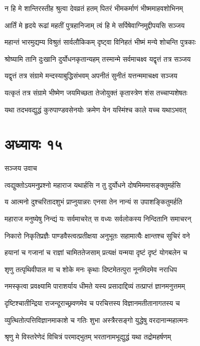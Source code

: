 \twolineshloka
{न हि मे शान्तिरस्तीह श्रुत्वा देवव्रतं हतम्}
{पितरं भीमकर्माणं भीष्ममाहवशोभिनम्}


\twolineshloka
{आर्तिं मे हृदये रूढां महतीं पुत्रहानिजाम्}
{त्वं हि मे सर्पिषेवाग्निमुद्दीपयसि सञ्जय}


\twolineshloka
{महान्तं भारमुद्यम्य विश्रुतं सार्वलौकिकम्}
{दृष्ट्वा विनिहतं भीष्मं मन्ये शोचन्ति पुत्रकाः}


\twolineshloka
{श्रोष्यामि तानि दुःखानि दुर्योधनकृतान्यहम्}
{तस्मान्मे सर्वमाचक्ष्व यद्वृत्तं तत्र सञ्जय}


\twolineshloka
{यद्वृत्तं तत्र संग्रामे मन्दस्याबुद्धिसंभवम्}
{अपनीतं सुनीतं यत्तन्ममाचक्ष्व सञ्जय}


\twolineshloka
{यत्कृतं तत्र संग्रामे भीष्मेण जयमिच्छता}
{तेजोयुक्तं कृतास्त्रेण शंस तच्चाप्यशेषतः}


\twolineshloka
{यथा तदभवद्युद्धं कुरुपाण्डवसेनयोः}
{क्रमेण येन यस्मिंश्च काले यच्च यथाऽभवत्}


\chapter{अध्यायः १५}
\twolineshloka
{सञ्जय उवाच}
{}


\twolineshloka
{त्वद्युक्तोऽयमनुप्रश्नो महाराज यथार्हसि}
{न तु दुर्योधने दोषमिममासङ्क्तुमर्हसि}


\twolineshloka
{य आत्मनो दुश्चरितादशुभं प्राप्नुयान्नरः}
{एनसा तेन नान्यं स उपाशङ्कितुमर्हति}


\twolineshloka
{महाराज मनुष्येषु निन्द्यं यः सर्वमाचरेत्}
{स वध्यः सर्वलोकस्य निन्दितानि समाचरन्}


\twolineshloka
{निकारो निकृतिप्रज्ञैः पाण्डवैस्त्वत्प्रतीक्षया}
{अनुभूतः सहामात्यैः क्षान्तश्च सुचिरं वने}


\twolineshloka
{हयानां च गजानां च राज्ञां चामिततेजसाम्}
{प्रत्यक्षं यन्मया दृष्टं दृष्टं योगबलेन च}


\twolineshloka
{शृणु तत्पृथिवीपाल मा च शोके मनः कृथाः}
{दिष्टमेतत्पुरा नूनमिदमेव नराधिप}


\twolineshloka
{नमस्कृत्वा प्रवक्ष्यामि पाराशर्याय धीमते}
{यस्य प्रसादाद्दिव्यं तत्प्राप्तं ज्ञानमनुत्तमम्}


\twolineshloka
{दृष्टिश्चातीन्द्रिया राजन्दूराच्छ्रवणमेव च}
{परचित्तस्य विज्ञानमतीतानागतस्य च}


\twolineshloka
{व्युत्थितोत्पत्तिविज्ञानमाकाशे च गतिः शुभा}
{अस्त्रैरसङ्गो युद्धेषु वरदानान्महात्मनः}


\twolineshloka
{श्रृणु मे विस्तरेणेदं विचित्रं परमाद्भुतम्}
{भरतानामभूद्युद्धं यथा तद्रोमहर्षणम्}


